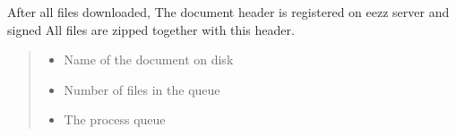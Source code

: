 \documentclass[letterpaper,10pt,english]{sphinxmanual}
\begin{document}
\begin{savenotes}
\begin{fulllineitems}
\begin{savenotes}
\begin{fulllineitems}
\end{fulllineitems}\end{savenotes}


\begin{savenotes}\begin{fulllineitems}
\label{\detokenize{eezz:eezz.document.TDocuments.create_document}}
\pysigstartsignatures
{}
\pysigstopsignatures
\sphinxAtStartPar
After all files downloaded, The document header is registered on eezz server and signed
All files are zipped together with this header.
\begin{quote}\begin{description}
\begin{itemize}
\item {} 
\sphinxAtStartPar
{} \textendash{} Name of the document on disk

\item {} 
\sphinxAtStartPar
{} \textendash{} Number of files in the queue

\item {} 
\sphinxAtStartPar
{} \textendash{} The process queue

\end{itemize}

\end{description}\end{quote}

\end{fulllineitems}\end{savenotes}



\end{fulllineitems}
\end{savenotes}
\end{document}
